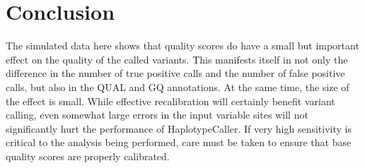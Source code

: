 \documentclass{report}
\begin{document}
\section{Conclusion}

The simulated data here shows that quality scores do have a small but important effect on the quality of the called variants. This manifests itself in not only the difference in the number of true positive calls and the number of false positive calls, but also in the QUAL and GQ annotations. At the same time, the size of the effect is small. While effective recalibration will certainly benefit variant calling, even somewhat large errors in the input variable sites will not significantly hurt the performance of HaplotypeCaller. If very high sensitivity is critical to the analysis being performed, care must be taken to ensure that base quality scores are properly calibrated.

\printbibliography
\end{document}
